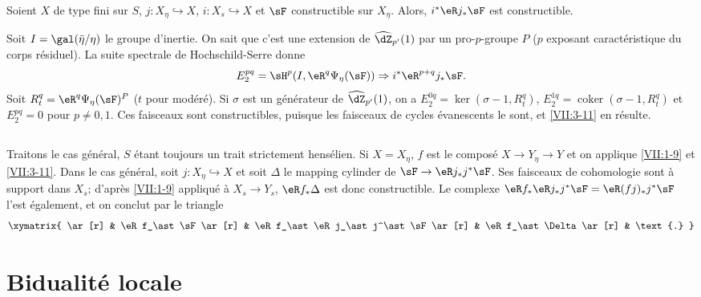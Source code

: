 \begin{lemma_}\label{VII:3-11}
Soient $X$ de type fini sur $S$, $j:X_\eta\hookrightarrow X$, 
$i:X_s\hookrightarrow X$ et $\sF$ constructible sur $X_\eta$. Alors, 
$i^\ast\eR j_\ast \sF$ est constructible. 
\end{lemma_}

Soit $I=\gal(\bar\eta/\eta)$ le groupe d'inertie. On sait que c'est une 
extension de $\widehat\dZ_{p'}(1)$ par un pro-$p$-groupe $P$ ($p$ exposant 
caractéristique du corps résiduel). La suite spectrale de Hochschild-Serre 
donne 
\[
  E_2^{p q} = \sH^p(I,\eR^q\Psi_\eta(\sF))\Rightarrow i^\ast \eR^{p+q}j_\ast\sF \text{.} 
\]
Soit $R_t^q = \eR^q\Psi_\eta(\sF)^P$ ($t$ pour modéré). Si $\sigma$ est un 
générateur de $\widehat\dZ_{p'}(1)$, on a 
$E_2^{0 q} = \ker(\sigma-1,R_t^q)$, 
$E_2^{1 q} = \operatorname{coker}(\sigma-1,R_t^q)$ et $E_2^{p q} = 0$ pour 
$p\ne 0,1$. Ces faisceaux sont constructibles, puisque les faisceaux de cycles 
évanescents le sont, et \ref{VII:3-11} en résulte. 





\subsection{}\label{VII:3-12}

Traitons le cas général, $S$ étant toujours un trait strictement 
hensélien. Si $X=X_\eta$, $f$ est le composé $X\to Y_\eta \to Y$ et on 
applique \ref{VII:1-9} et \ref{VII:3-11}. Dans le cas général, soit 
$j:X_\eta\hookrightarrow X$ et soit $\Delta$ le mapping cylinder de 
$\sF \to \eR j_\ast j^\ast \sF$. Ses faisceaux de cohomologie sont à support 
dans $X_s$; d'après \ref{VII:1-9} appliqué à $X_s \to Y_s$, 
$\eR f_\ast \Delta$ est donc constructible. Le complexe 
$\eR f_\ast \eR j_\ast j^\ast \sF = \eR(f j)_\ast j^\ast \sF$ l'est 
également, et on conclut par le triangle 
\[\xymatrix{
  \ar[r] 
    & \eR f_\ast \sF \ar[r] 
    & \eR f_\ast \eR j_\ast j^\ast \sF \ar[r] 
    & \eR f_\ast \Delta \ar[r] 
    & \text{.} 
}\]










\section{Bidualité locale}\label{VII:4}





